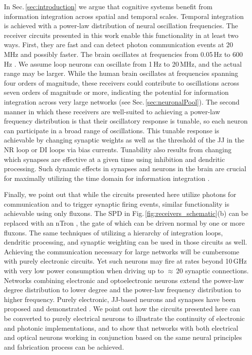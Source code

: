 \documentclass[twocolumn]{article}
\begin{document}
In Sec.\,\ref{sec:introduction} we argue that cognitive systems benefit from information integration across spatial and temporal scales. Temporal integration is achieved with a power-law distribution of neural oscillation frequencies. The receiver circuits presented in this work enable this functionality in at least two ways. First, they are fast and can detect photon communication events at 20 MHz and possibly faster. The brain oscillates at frequencies from 0.05\,Hz to 600\,Hz \cite{budr2004}. We assume loop neurons can oscillate from 1\,Hz to 20\,MHz, and the actual range may be larger. While the human brain oscillates at frequencies spanning four orders of magnitude, these receivers could contribute to oscillations across seven orders of magnitude or more, indicating the potential for information integration across very large networks \cite{stsa2000} (see Sec.\,\ref{sec:neuronalPool}). The second manner in which these receivers are well-suited to achieving a power-law frequency distribution is that their oscillatory response is tunable, so each neuron can participate in a broad range of oscillations. This tunable response is achievable by changing synaptic weights as well as the threshold of the JJ in the NR loop or DI loops via bias currents. Tunability also results from changing which synapses are effective at a given time using inhibition and dendritic processing. Such dynamic effects in synapses and neurons in the brain are crucial for maximally utilizing the time domain for information integration \cite{bu2006}.

Finally, we point out that while the circuits presented here utilize photons for communication and to trigger synaptic firing events, similar functionality is achievable using only fluxons. The SPD in Fig.\,\ref{fig:receivers_schematic}(b) can be replaced with an nTron \cite{mcbe2014}, the gate of which can be driven normal by one or more fluxons. The same techniques of utilizing a hierarchy of integration loops, dendritic processing, and synaptic weighting can be used in those circuits as well. Achieving the communication necessary for large networks \cite{sh2018_ICRC} will be cumbersome with purely electronic circuits. Yet such neurons may fire at rates beyond 10\,GHz with very low power consumption when driving up to $\approx$\,20 synaptic connections. Networks combining electronic and optoelectronic neurons extend the power-law degree distribution to lower degree and the power-law frequency distribution to higher frequency. Purely electronic, JJ-based neurons and synapses have been proposed \cite{hias2007,crsc2010,ru2016} and demonstrated \cite{segu2014,scdo2018}. We point out how the circuits presented here can be converted to purely electrical neurons to illustrate the continuity of electronic and photonic implementations, and to show that networks with both electrical and optical neurons working in conjunction based on the same neural principles and fabrication process can be achieved.
\end{document}
